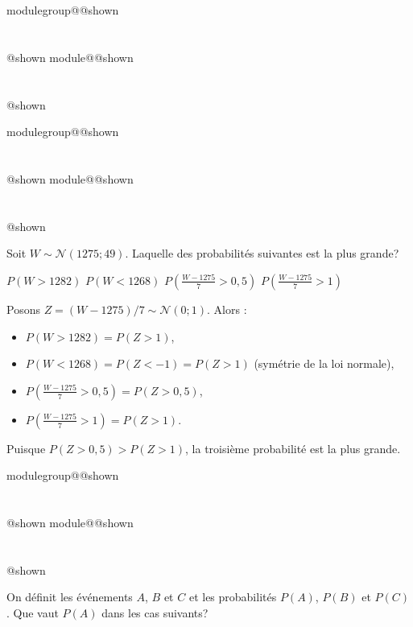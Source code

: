 \documentclass{Evaluation}
\makeatletter
\newcommand{\currentmodulekey}{}
\newcommand{\currentmoduletitle}{}
\newcommand{\currentgroupkey}{}
\newcommand{\currentgrouptitle}{}
\newcommand{\showmoduleifneeded}{%
  \ifx\currentgroupkey\empty\else
    \expandafter\ifx\csname modulegroup@\currentgroupkey @shown\endcsname\relax
      \section*{\currentgrouptitle}%
      \expandafter\gdef\csname modulegroup@\currentgroupkey @shown\endcsname{1}%
    \fi
  \fi
  \expandafter\ifx\csname module@\currentmodulekey @shown\endcsname\relax
    \section*{\currentmoduletitle}%
    \expandafter\gdef\csname module@\currentmodulekey @shown\endcsname{1}%
  \fi
}
\newenvironment{H23}{\showmoduleifneeded}{}
\newenvironment{H26}{\showmoduleifneeded}{}
\newenvironment{H26r}{\showmoduleifneeded}{}
\makeatother
\begin{document}
\begin{questions}
\begin{H26r}
\end{H26r}

\begin{H26}
\question {} %
Soit $W\sim\mathcal{N}(1275; 49)$. Laquelle des probabilités suivantes est la plus grande?

\begin{checkboxes}
    \choice $P(W>1282)$
    \choice $P(W<1268)$
    \correctchoice $\displaystyle P\left(\frac{W-1275}{7}>0,5\right)$
    \choice $\displaystyle P\left(\frac{W-1275}{7}>1\right)$
\end{checkboxes}

\begin{solution}
Posons $Z=(W-1275)/7\sim\mathcal{N}(0;1)$. Alors :
\begin{itemize}
  \item $P(W>1282)=P(Z>1)$,
  \item $P(W<1268)=P(Z<-1)=P(Z>1)$ (symétrie de la loi normale),
  \item $P\!\left(\frac{W-1275}{7}>0{,}5\right)=P(Z>0{,}5)$,
  \item $P\!\left(\frac{W-1275}{7}>1\right)=P(Z>1)$.
\end{itemize}
Puisque $P(Z>0{,}5)>P(Z>1)$, la troisième probabilité est la plus grande.
\end{solution}

\end{H26}

\begin{H23}
\question {} %
On définit les événements $A$, $B$ et $C$ et les probabilités $P(A)$, $P(B)$ et $P(C)$. Que vaut $P(A)$ dans les cas suivants?
\end{H23}
\end{questions}
\end{document}
